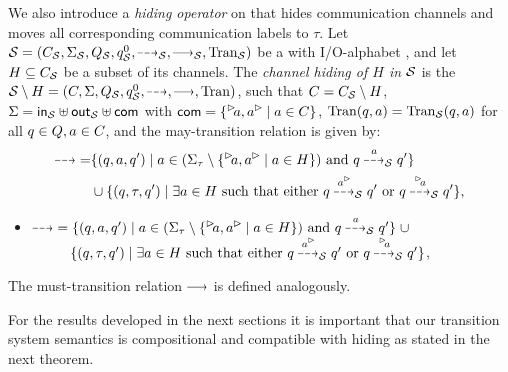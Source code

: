 We also introduce a \emph{hiding operator} on \MAIOTSs that hides communication channels
and moves all corresponding communication labels to $\tau$.
Let $\S = \maiotstup{\S}$ be a \MAIOTS with I/O-alphabet \ioalpha{\S}, and let $H \subseteq \chan_\S$ be a subset of its channels. The \emph{channel hiding of $H$ in $\S$} is the \MAIOTS $\S \setminus H = (\chan, \Sigma,Q_\S,q^0_\S,\may{},\must{},\val)$, such that 
$\chan = \chan_\S \setminus H$, $\Sigma = \inset_\S \uplus \outset_\S \uplus \com$ with $\com = \{\inact{a},\outact{a} \mid a \in \chan\}$,
 $\val(q,a) = \val_\S(q,a)$  for all $q \in Q, a \in \chan$, and the may-transition relation is given by:
\begin{align*}
    \may{} \; = &\{(q,a,q') \mid a \in (\Sigmat \setminus \{\inact{a},\outact{a} \mid a \in H\}) \text{ and } q \may{a}_\S q' \} \\
              &\cup \{ (q,\tau ,q') \mid \exists a \in H \text{ such that either } q \may{\outact{a}}_\S q'  \text{ or }   q \may{\inact{a}}_\S q' \},
\end{align*}
    \begin{itemize}
        \item[~] $\may{} \; = \{(q,a,q') \mid a \in (\Sigmat \setminus \{\inact{a},\outact{a} \mid a \in H\}) \text{ and } q \may{a}_\S q' \} \; \cup $\\
              $~~\qquad \{ (q,\tau ,q') \mid \exists a \in H \text{ such that either } q \may{\outact{a}}_\S q'  \text{ or }   q \may{\inact{a}}_\S q' \}$,
    \end{itemize}
The must-transition relation $\must{}$ is defined analogously.

For the results developed in the next sections it is important that our transition system semantics is compositional and
compatible with hiding as stated in the next theorem. 

